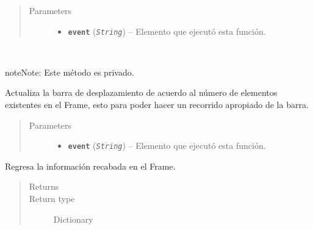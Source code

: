 \documentclass[class=report, crop=false]{standalone}
\begin{document}
\begin{fulllineitems}
\begin{fulllineitems}
\begin{quote}\begin{description}
\item[{Parameters}] \leavevmode\begin{itemize}
\item \textbf{\texttt{event}} (\emph{\texttt{String}}) -- Elemento que ejecutó esta función.
\end{itemize}
\end{description}\end{quote}

\end{fulllineitems}

\begin{fulllineitems}

~

\begin{notice}{note}{Note:}
Este método es privado.
\end{notice}

Actualiza la barra de desplazamiento de acuerdo al número de elementos
existentes en el Frame, esto para poder hacer un recorrido apropiado de 
la barra.

\begin{quote}\begin{description}
\item[{Parameters}] \leavevmode\begin{itemize}
\item \textbf{\texttt{event}} (\emph{\texttt{String}}) -- Elemento que ejecutó esta función.
\end{itemize}
\end{description}\end{quote}

\end{fulllineitems}

\begin{fulllineitems}

Regresa la información recabada en el Frame.

\begin{quote}\begin{description}
\item[{Returns}] \leavevmode
\item[{Return type}] \leavevmode
Dictionary
\end{description}\end{quote}


\end{fulllineitems}
\end{fulllineitems}
\end{document}

